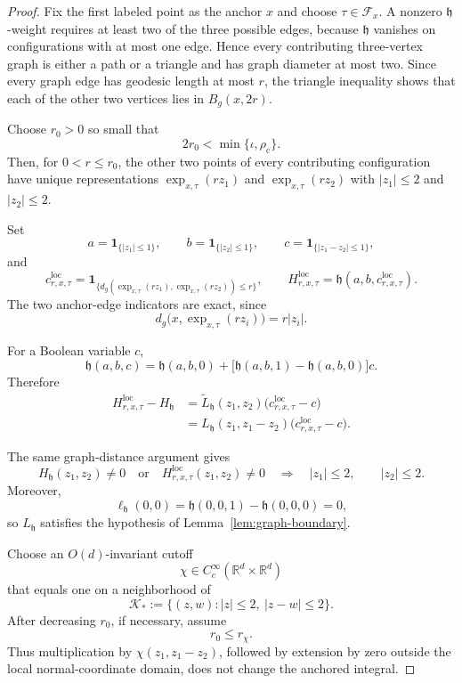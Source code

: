 \documentclass[11pt]{article}
\theoremstyle{remark}
\newcommand{\R}{\mathbb R}
\newcommand{\ind}{\mathbf 1}
\numberwithin{equation}{section}
\begin{document}
\begin{proof}
Fix the first labeled point as the anchor \(x\) and choose
\(\tau\in\mathcal F_x\).
A nonzero \(\mathfrak h\)-weight requires at least two of the three possible
edges, because \(\mathfrak h\) vanishes on configurations with at most one
edge.  Hence every contributing three-vertex graph is either a path or a
triangle and has graph diameter at most two.  Since every graph edge has
geodesic length at most \(r\), the triangle inequality shows that each of
the other two vertices lies in \(B_g(x,2r)\).

Choose \(r_0>0\) so small that
\[
2r_0<\min\{\iota,\rho_{\mathrm c}\}.
\]
Then, for \(0<r\le r_0\), the other two points of every contributing
configuration have unique representations
$\exp_{x,\tau}(rz_1)$ and $\exp_{x,\tau}(rz_2)$
with $|z_1|\le2$ and $|z_2|\le2$.

Set
\[
a=\ind_{\{|z_1|\le1\}},
\qquad
b=\ind_{\{|z_2|\le1\}},
\qquad
c=\ind_{\{|z_1-z_2|\le1\}},
\]
and
\[
c^{\mathrm{loc}}_{r,x,\tau}
=
\ind_{\{
d_g(\exp_{x,\tau}(rz_1),\exp_{x,\tau}(rz_2))
\le r
\}},\qquad 
H^{\mathrm{loc}}_{r,x,\tau}
=
\mathfrak h(a,b,c^{\mathrm{loc}}_{r,x,\tau}).
\]
The two anchor-edge indicators are exact, since
\[
d_g\bigl(x,\exp_{x,\tau}(rz_i)\bigr)=r|z_i|.
\]

For a Boolean variable \(c\),
\[
\mathfrak h(a,b,c)
=
\mathfrak h(a,b,0)
+
\bigl[
\mathfrak h(a,b,1)-\mathfrak h(a,b,0)
\bigr]c.
\]
Therefore
\[
\begin{aligned}
H^{\mathrm{loc}}_{r,x,\tau}
-
H_{\mathfrak h}
&=
\widetilde L_{\mathfrak h}(z_1,z_2)
\bigl(
c^{\mathrm{loc}}_{r,x,\tau}-c
\bigr)\\
&=
L_{\mathfrak h}(z_1,z_1-z_2)
\bigl(
c^{\mathrm{loc}}_{r,x,\tau}-c
\bigr).
\end{aligned}
\]

The same graph-distance argument gives
\[
H_{\mathfrak h}(z_1,z_2)\ne0
\quad\text{or}\quad
H^{\mathrm{loc}}_{r,x,\tau}(z_1,z_2)\ne0
\quad\Longrightarrow\quad
|z_1|\le2,\qquad |z_2|\le2.
\]
Moreover,
\[
\ell_{\mathfrak h}(0,0)
=
\mathfrak h(0,0,1)-\mathfrak h(0,0,0)
=
0,
\]
so \(L_{\mathfrak h}\) satisfies the hypothesis of
Lemma~\ref{lem:graph-boundary}.

Choose an \(O(d)\)-invariant cutoff
\[
\chi\in C_c^\infty(\R^d\times\R^d)
\]
that equals one on a neighborhood of
\[
\mathcal K_*
:=
\{(z,w):|z|\le2,\ |z-w|\le2\}.
\]
After decreasing \(r_0\), if necessary, assume
\[
r_0\le r_\chi.
\]
Thus multiplication by \(\chi(z_1,z_1-z_2)\), followed by extension by
zero outside the local normal-coordinate domain, does not change the
anchored integral.


\end{proof}
\end{document}
